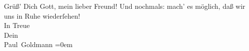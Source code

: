            \pstart
           Grüß’ Dich Gott, mein lieber Freund! Und nochmals: mach’ es möglich, daß wir uns
                  {\pb}in Ruhe wiederſehen! {\\[\baselineskip]}In Treue {\\[\baselineskip]}Dein {\\[\baselineskip]}\spacefill\mbox{Paul Goldmann}\pend
           \leftskip=0em{}\endnumbering{}  
      